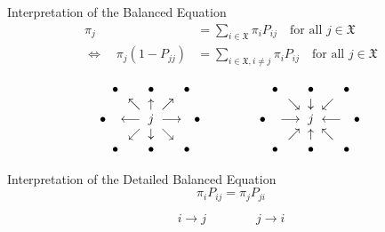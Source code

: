 \documentclass[letterpaper, mathserif]{beamer}
\def\X{\mathfrak{X}}
\begin{document}
\begin{frame}{Interpretation of the Balanced Equation}
\begin{align*}
\pi_j &= \sum_{i\in\X}\pi_i P_{ij}\quad\text{for all }j\in\X\\
\Leftrightarrow\quad\pi_j(1-P_{jj}) &= \sum_{i\in\X, i\neq j}\pi_i P_{ij}\quad\text{for all }j\in\X
\end{align*}
\begin{center}
\end{center}
$$
\arraycolsep=3pt
\begin{array}{c@{\,}rcl@{\,}c}
~~~\bullet& & \bullet &  &\bullet~~~\\
&\nwarrow&\uparrow&\nearrow&\\
\bullet~~~&\longleftarrow & j & \longrightarrow &~~\bullet\\
&\swarrow&\downarrow&\searrow&\\
~~~\bullet& &\bullet &  &\bullet~~~\\
\end{array}
\qquad\qquad
\begin{array}{c@{\,}rcl@{\,}c}
~~~\bullet& & \bullet &  &\bullet~~~\\
&\searrow&\downarrow&\swarrow&\\
\bullet~~~&\longrightarrow & j & \longleftarrow & ~~\bullet\\
&\nearrow&\uparrow&\nwarrow&\\
~~~\bullet& &\bullet &  &\bullet~~~
\end{array}
$$

\end{frame}
\begin{frame}{Interpretation of the Detailed Balanced Equation}
$$\pi_i P_{ij}=\pi_j P_{ji}$$
\begin{center}
\end{center}
$$
i\longrightarrow j\qquad\qquad j\longrightarrow i
$$
\end{frame}
\end{document}
